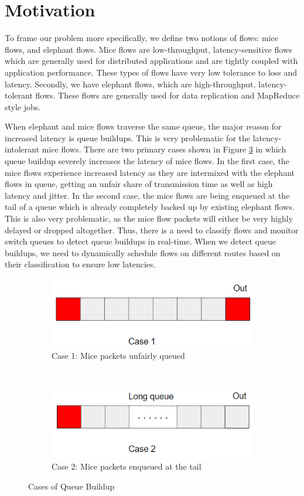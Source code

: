 \section{Motivation}
To frame our problem more specifically, we define two notions of flows: mice flows, and elephant flows. Mice flows are low-throughput, latency-sensitive flows which are generally used for distributed applications and are tightly coupled with application performance. These types of flows have very low tolerance to loss and latency. Secondly, we have elephant flows, which are high-throughput, latency-tolerant flows. These flows are generally used for data replication and MapReduce style jobs. 

When elephant and mice flows traverse the same queue, the major reason for increased latency is queue buildups. This is very problematic for the latency-intolerant mice flows. There are two primary cases shown in Figure \ref{fig:cases} in which queue buildup severely increases the latency of mice flows. In the first case, the mice flows experience increased latency as they are intermixed with the elephant flows in queue, getting an unfair share of transmission time as well as high latency and jitter. In the second case, the mice flows are being enqueued at the tail of a queue which is already completely backed up by existing elephant flows. This is also very problematic, as the mice flow packets will either be very highly delayed or dropped altogether. Thus, there is a need to classify flows and monitor switch queues to detect queue buildups in real-time. When we detect queue buildups, we need to dynamically schedule flows on different routes based on their classification to ensure low latencies. 

\begin{figure}[H]
\centering
\begin{subfigure}{.55\textwidth}
  \centering
  \includegraphics[width=.8\linewidth]{case1}
  \caption{Case 1: Mice packets unfairly queued}
  \label{fig:case1}
\end{subfigure}%
\\
\begin{subfigure}{.55\textwidth}
  \centering
  \includegraphics[width=.8\linewidth]{case2}
  \caption{Case 2: Mice packets enqueued at the tail }
  \label{fig:case2}
\end{subfigure}
\caption{Cases of Queue Buildup}
\label{fig:cases}
\end{figure}

